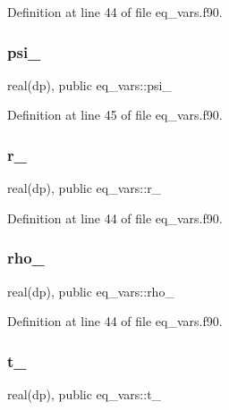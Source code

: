 Definition at line 44 of file eq\+\_\+vars.\+f90.

\mbox{\label{namespaceeq__vars_a2bb2594492faa83869c3eaf8cabe521e}} 
\subsubsection{\texorpdfstring{psi\+\_}{psi\_0}}
{\footnotesize\ttfamily real(dp), public eq\+\_\+vars\+::psi\+\_}



Definition at line 45 of file eq\+\_\+vars.\+f90.

\mbox{\label{namespaceeq__vars_a0c1f124ab3260a0f6937df9189a18184}} 
\subsubsection{\texorpdfstring{r\+\_}{r\_0}}
{\footnotesize\ttfamily real(dp), public eq\+\_\+vars\+::r\+\_}



Definition at line 44 of file eq\+\_\+vars.\+f90.

\mbox{\label{namespaceeq__vars_a8c9bdb18a418329b9be241342ea704e3}} 
\subsubsection{\texorpdfstring{rho\+\_}{rho\_0}}
{\footnotesize\ttfamily real(dp), public eq\+\_\+vars\+::rho\+\_}



Definition at line 44 of file eq\+\_\+vars.\+f90.

\mbox{\label{namespaceeq__vars_a5170d0b84bb0faf24d5fdcf7c9371620}} 
\subsubsection{\texorpdfstring{t\+\_}{t\_0}}
{\footnotesize\ttfamily real(dp), public eq\+\_\+vars\+::t\+\_}



